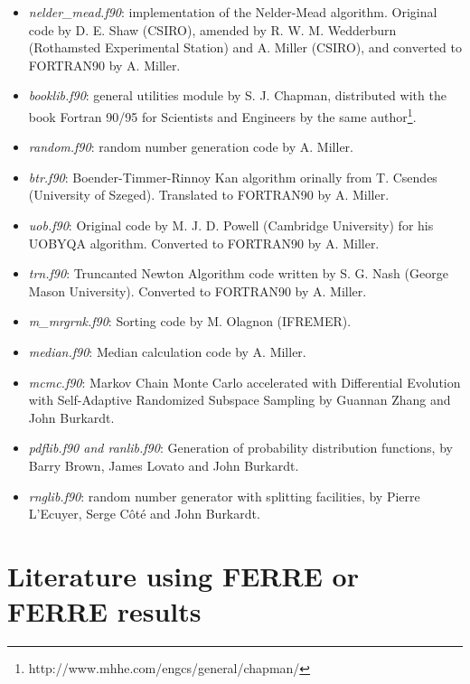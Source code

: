 \documentclass[12pt]{article}
\begin{document}
\begin{itemize}
\item {\it nelder\_mead.f90}: implementation of the Nelder-Mead algorithm. 
Original code by D. E. Shaw (CSIRO), amended by R. W. M. Wedderburn
 (Rothamsted Experimental Station) and A. Miller (CSIRO), and converted to FORTRAN90 by
 A. Miller.

\item {\it booklib.f90}: general utilities module by S. J. Chapman, distributed with the book 
Fortran 90/95 for Scientists and Engineers by the same author\footnote{http://www.mhhe.com/engcs/general/chapman/}.

\item {\it random.f90}: random number generation code by A. Miller.

\item {\it btr.f90}: Boender-Timmer-Rinnoy Kan algorithm orinally from T. Csendes (University of Szeged).
Translated to FORTRAN90 by A. Miller.

\item {\it uob.f90}: Original code by M. J. D. Powell (Cambridge University) for his UOBYQA algorithm. 
Converted to FORTRAN90 by A. Miller.

\item {\it trn.f90}: Truncanted Newton Algorithm code written by S. G. Nash (George Mason University).
Converted to FORTRAN90 by A. Miller.

\item {\it m\_mrgrnk.f90}: Sorting code by M. Olagnon (IFREMER).

\item {\it median.f90}: Median calculation code by A. Miller.

\item {\it mcmc.f90}: Markov Chain Monte Carlo accelerated with Differential Evolution with Self-Adaptive Randomized Subspace Sampling by Guannan Zhang and John Burkardt. 
\item {\it pdflib.f90 and ranlib.f90}: Generation of probability distribution functions, by Barry Brown, James Lovato and John Burkardt.

\item {\it rnglib.f90}: random number generator with splitting facilities, by Pierre L'Ecuyer, Serge C\^ot\'e and John Burkardt.

\end{itemize}

\section{Literature using FERRE or FERRE results}
\label{literature}
\end{document}
